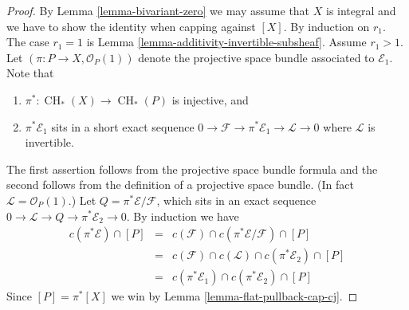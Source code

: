 \documentclass[10pt,a4paper]{amsart}
\theoremstyle{plain}
\theoremstyle{definition}
\theoremstyle{remark}
\numberwithin{equation}{subsection}
\def\CH{\mathop{\mathrm{CH}}\nolimits}
\begin{document}
\begin{proof}
By Lemma \ref{lemma-bivariant-zero} we may assume that $X$ is integral
and we have to show the identity when capping against $[X]$.
By induction on $r_1$. The case $r_1 = 1$ is
Lemma \ref{lemma-additivity-invertible-subsheaf}.
Assume $r_1 > 1$. Let $(\pi : P \to X, \mathcal{O}_P(1))$
denote the projective space bundle associated to $\mathcal{E}_1$. Note that
\begin{enumerate}
\item $\pi^* : \CH_*(X) \to \CH_*(P)$ is injective, and
\item $\pi^*\mathcal{E}_1$ sits in a short exact sequence
$0 \to \mathcal{F} \to \pi^*\mathcal{E}_1 \to \mathcal{L} \to 0$
where $\mathcal{L}$ is invertible.
\end{enumerate}
The first assertion follows from the projective space bundle formula
and the second follows from the definition of a projective space bundle.
(In fact $\mathcal{L} = \mathcal{O}_P(1)$.)
Let $Q = \pi^*\mathcal{E}/\mathcal{F}$, which sits in an
exact sequence $0 \to \mathcal{L} \to Q \to \pi^*\mathcal{E}_2 \to 0$.
By induction we have
\begin{eqnarray*}
c(\pi^*\mathcal{E}) \cap [P]
& = &
c(\mathcal{F}) \cap c(\pi^*\mathcal{E}/\mathcal{F}) \cap [P] \\
& = &
c(\mathcal{F}) \cap c(\mathcal{L}) \cap c(\pi^*\mathcal{E}_2) \cap [P] \\
& = &
c(\pi^*\mathcal{E}_1) \cap c(\pi^*\mathcal{E}_2) \cap [P]
\end{eqnarray*}
Since $[P] = \pi^*[X]$ we
win by Lemma \ref{lemma-flat-pullback-cap-cj}.
\end{proof}
\end{document}
